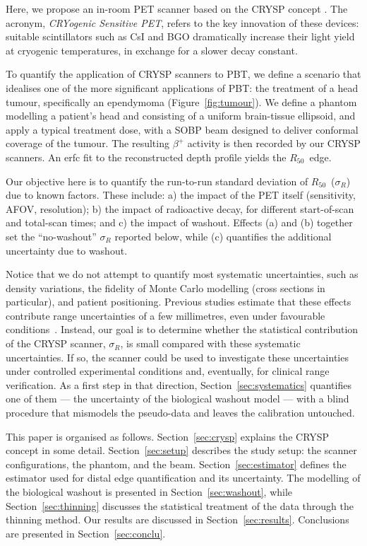 \documentclass[11pt]{article}
\newcommand{\Rc}{\ensuremath{R_{50}}}
\begin{document}
Here, we propose an in-room PET scanner based on the CRYSP concept \cite{soleti_crysp}. The acronym, \emph{CRYogenic Sensitive PET}, refers to the key innovation of these devices: suitable scintillators such as CsI and BGO dramatically increase their light yield at cryogenic temperatures, in exchange for a slower decay constant. 

To quantify the application of CRYSP scanners to PBT, we define a scenario that idealises one of the more significant applications of PBT: the treatment of a head tumour, specifically an ependymoma (Figure~\ref{fig:tumour}). We define a phantom modelling a patient's head and consisting of a uniform brain-tissue ellipsoid, and apply a typical treatment dose, with a SOBP beam designed to deliver conformal coverage of the tumour. The resulting $\beta^+$ activity is then recorded by our CRYSP scanners. An erfc fit to the reconstructed depth profile yields the \Rc\ edge.

Our objective here is to quantify the run-to-run standard deviation of \Rc\ ($\sigma_R$) due to known factors. These include: a) the impact of the PET itself (sensitivity, AFOV, resolution); b) the impact of radioactive decay, for different start-of-scan and total-scan times; and c) the impact of washout. Effects (a) and (b) together set the ``no-washout'' $\sigma_R$ reported below, while (c) quantifies the additional uncertainty due to washout.

Notice that we do not attempt to quantify most systematic uncertainties, such as density variations, the fidelity of Monte Carlo modelling (cross sections in particular), and patient positioning. Previous studies estimate that these effects contribute range uncertainties of a few millimetres, even under favourable conditions~\cite{Espana2011,Knopf2009,Mizuno2003,Paganetti2012}. Instead, our goal is to determine whether the statistical contribution of the CRYSP scanner, $\sigma_R$, is small compared with these systematic uncertainties. If so, the scanner could be used to investigate these uncertainties under controlled experimental conditions and, eventually, for clinical range verification. As a first step in that direction, Section~\ref{sec:systematics} quantifies one of them --- the uncertainty of the biological washout model --- with a blind procedure that mismodels the pseudo-data and leaves the calibration untouched.

This paper is organised as follows. Section~\ref{sec:crysp} explains the CRYSP concept in some detail. Section~\ref{sec:setup} describes the study setup: the scanner configurations, the phantom, and the beam. Section~\ref{sec:estimator} defines the estimator used for distal edge quantification and its uncertainty. The modelling of the biological washout is presented in Section~\ref{sec:washout}, while Section~\ref{sec:thinning} discusses the
statistical treatment of the data through the thinning method. 
Our results are discussed in Section~\ref{sec:results}. Conclusions are presented in Section~\ref{sec:conclu}.
\end{document}
